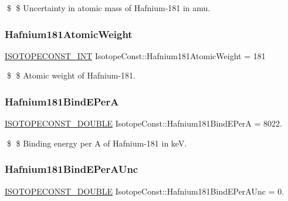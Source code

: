 \$ \$ Uncertainty in atomic mass of Hafnium-\/181 in amu. \mbox{\label{group___isotope_const-_hafnium-_hf181_ga4a9a82f6165dbfcf82761132b5d173bb}} 
\subsubsection{\texorpdfstring{Hafnium181\+Atomic\+Weight}{Hafnium181AtomicWeight}}
{\footnotesize\ttfamily \mbox{\hyperlink{group___isotope_const-_macros_ga5f18360b3e99483a35c32d789e62621c}{I\+S\+O\+T\+O\+P\+E\+C\+O\+N\+S\+T\+\_\+\+I\+NT}} Isotope\+Const\+::\+Hafnium181\+Atomic\+Weight = 181}

\$ \$ Atomic weight of Hafnium-\/181. \mbox{\label{group___isotope_const-_hafnium-_hf181_ga1646c64b711e54ec38cf622e0950cd6e}} 
\subsubsection{\texorpdfstring{Hafnium181\+Bind\+E\+PerA}{Hafnium181BindEPerA}}
{\footnotesize\ttfamily \mbox{\hyperlink{group___isotope_const-_macros_ga8f45a7272ce02c0b4c65c44636ed719a}{I\+S\+O\+T\+O\+P\+E\+C\+O\+N\+S\+T\+\_\+\+D\+O\+U\+B\+LE}} Isotope\+Const\+::\+Hafnium181\+Bind\+E\+PerA = 8022.}

\$ \$ Binding energy per A of Hafnium-\/181 in keV. \mbox{\label{group___isotope_const-_hafnium-_hf181_ga2c0acb47534c68d8cf35df43938fcd8a}} 
\subsubsection{\texorpdfstring{Hafnium181\+Bind\+E\+Per\+A\+Unc}{Hafnium181BindEPerAUnc}}
{\footnotesize\ttfamily \mbox{\hyperlink{group___isotope_const-_macros_ga8f45a7272ce02c0b4c65c44636ed719a}{I\+S\+O\+T\+O\+P\+E\+C\+O\+N\+S\+T\+\_\+\+D\+O\+U\+B\+LE}} Isotope\+Const\+::\+Hafnium181\+Bind\+E\+Per\+A\+Unc = 0.}

